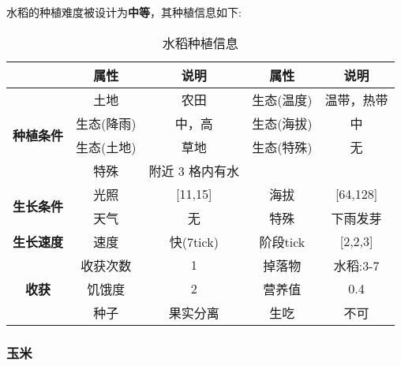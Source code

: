 水稻的种植难度被设计为\textbf{中等}，其种植信息如下:

\begin{table}[H]
    \centering
    \caption{水稻种植信息}
    \label{table:水稻种植信息}
    \setlength{\tabcolsep}{4mm}
    \begin{tabular}{c|cc|cc}
        \toprule
                                           & \textbf{属性} & \textbf{说明}   & \textbf{属性} & \textbf{说明} \\
        \midrule
        \multirow{4}{*}{\textbf{种植条件}} & 土地          & 农田            & 生态(温度)    & 温带，热带    \\
                                           & 生态(降雨)    & 中，高          & 生态(海拔)    & 中            \\
                                           & 生态(土地)    & 草地            & 生态(特殊)    & 无            \\
                                           & 特殊          & 附近 3 格内有水                                 \\
        \midrule
        \multirow{2}{*}{\textbf{生长条件}} & 光照          & [11,15]         & 海拔          & [64,128]      \\
                                           & 天气          & 无              & 特殊          & 下雨发芽      \\
        \midrule
        \textbf{生长速度}                  & 速度          & 快(7tick)       & 阶段tick      & [2,2,3]       \\
        \midrule
        \multirow{3}{*}{\textbf{收获}}     & 收获次数      & 1               & 掉落物        & 水稻:3-7      \\
                                           & 饥饿度        & 2               & 营养值        & 0.4           \\
                                           & 种子          & 果实分离        & 生吃          & 不可          \\
        \bottomrule
    \end{tabular}
\end{table}

\subsubsection{玉米}

